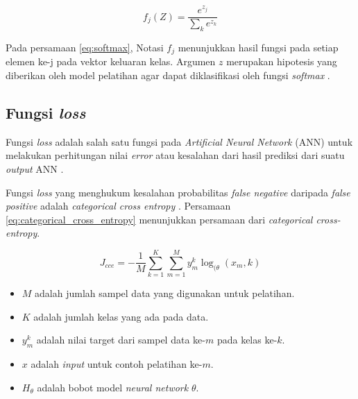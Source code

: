 \begin{equation}
    f_j(Z) = \frac{e^{z_j}}{\sum_k e^{z_k}}
    \label{eq:softmax}
\end{equation}

\par Pada persamaan \ref{eq:softmax}, Notasi $f_j$ menunjukkan hasil fungsi pada setiap elemen ke-j pada vektor keluaran kelas. Argumen $z$ merupakan hipotesis yang diberikan oleh model pelatihan agar dapat diklasifikasi oleh fungsi \textit{softmax} \citep{ilahiyah2018implementasi}. 



\subsection{Fungsi \textit{loss}}

\par Fungsi \textit{loss} adalah salah satu fungsi pada \textit{Artificial Neural Network} (ANN) untuk melakukan perhitungan nilai \textit{error} atau kesalahan dari hasil prediksi dari suatu \textit{output} ANN \citep{zhang2016neural}. 

\par Fungsi \textit{loss} yang menghukum kesalahan probabilitas \textit{false negative} daripada \textit{false positive} adalah \textit{categorical cross entropy} \citep{ho2019real}. Persamaan \ref{eq:categorical_cross_entropy} menunjukkan persamaan dari \textit{categorical cross-entropy}. 

\begin{equation}
    J_{cce} = -\frac{1}{M} \sum_{k=1}^{K} \sum_{m=1}^{M} y_{m}^{k} \log_{(\theta} (x_{m}, k)
    \label{eq:categorical_cross_entropy}
\end{equation}


\begin{itemize}

    \item $M$ adalah jumlah sampel data yang digunakan untuk pelatihan.
    \item $K$ adalah jumlah kelas yang ada pada data.
    \item $y_{m}^{k}$ adalah nilai target dari sampel data ke-$m$ pada kelas ke-$k$.
    \item $x$ adalah \textit{input} untuk contoh pelatihan ke-$m$.
    \item $H_\theta$ adalah bobot model \textit{neural network} $\theta$.
\end{itemize}



